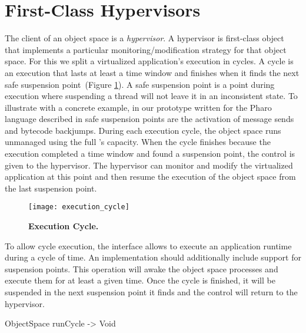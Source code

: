 
\section{First-Class Hypervisors}\label{sec:hypervisor}

The client of an object space is a \emph{hypervisor}. A hypervisor is first-class object that implements a particular monitoring/modification strategy for that object space. For this we split a virtualized application's execution in cycles. A cycle is an execution that lasts at least a time window and finishes when it finds the next safe suspension point~(Figure \ref{fig:execution_cycle}). A safe suspension point is a point during execution where suspending a thread will not leave it in an inconsistent state. To illustrate with a concrete example, in our \Vtt prototype written for the Pharo language described in  safe suspension points are the activation of message sends and bytecode backjumps. During each execution cycle, the object space runs unmanaged using the full \VM's capacity. When the cycle finishes because the execution completed a time window and found a suspension point, the control is given to the hypervisor. The hypervisor can monitor and modify the virtualized application at this point and then resume the execution of the object space from the last suspension point.

\begin{figure}[ht]
\center
\texttt{[image: execution\_cycle]}
\caption{\textbf{Execution Cycle.} \label{fig:execution_cycle}}
\end{figure}

To allow cycle execution, the  interface allows to execute an application runtime during a cycle of time. An \Vtt implementation should additionally include support for suspension points. This operation will awake the object space processes and execute them for at least a given time. Once the cycle is finished, it will be suspended in the next suspension point it finds and the control will return to the hypervisor.

\begin{code}
ObjectSpace {
    runCycle -> Void
}
\end{code}



